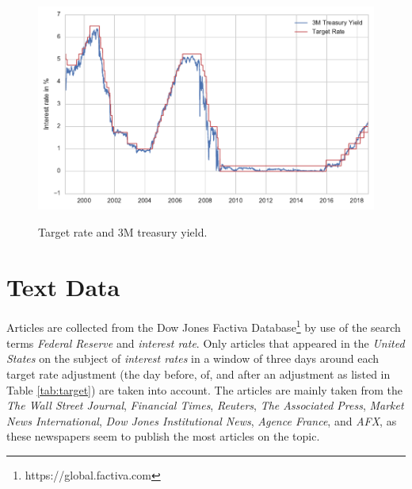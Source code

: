 \documentclass[11pt,a4paper,english,oneside]{book}
\numberwithin{equation}{chapter}
\begin{document}

\begin{figure}
	\caption{Target rate and 3M treasury yield.}
	\centering
	\includegraphics[scale=1]{Images/3Mtreasury.pdf}
	\label{3Mtreasury}
\end{figure}

\section{Text Data}\label{textdata}

Articles are collected from the Dow Jones Factiva Database\footnote{https://global.factiva.com} by use of the search terms \textit{Federal Reserve} and \textit{interest rate}. Only articles that appeared in the \textit{United States} on the subject of \textit{interest rates} in a window of three days around each target rate adjustment (the day before, of, and after an adjustment as listed in Table \ref{tab:target}) are taken into account. The articles are mainly taken from the \textit{The Wall Street Journal}, \textit{Financial Times}, \textit{Reuters}, \textit{The Associated Press}, \textit{Market News International}, \textit{Dow Jones Institutional News}, \textit{Agence France}, and \textit{AFX}, as these newspapers seem to publish the most articles on the topic. 
\end{document}
